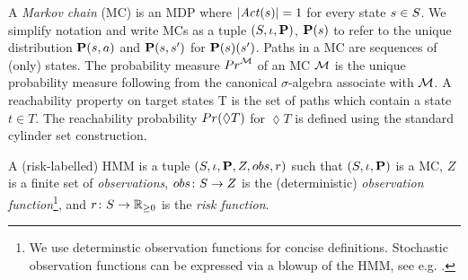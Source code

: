 \documentclass[runningheads]{llncs}
\newcommand{\Obs}{Z}
\newcommand{\act}{a}
\begin{document}
A \emph{Markov chain} (MC) is an MDP where $|\mathit{Act}(s)| = 1$ for every state $s \in S$. We simplify notation and write MCs as a tuple $\left(S, \iota,  \mathbf{P} \right)$, $\mathbf{P}(s)$ to refer to the unique distribution $\ptrans(s, \act)$ and $\mathbf{P}(s,s')$ for $\mathbf{P}(s)(s')$. Paths in a MC are sequences of (only) states.
The probability measure ${Pr}^{\mathcal{M}}$ of an MC $\mathcal{M}$ is the unique probability measure following from the canonical $\sigma$-algebra associate with $\mathcal{M}$.
A reachability property on target states T is the set of paths which contain a state $t \in T$. The reachability probability ${Pr}(\lozenge T)$ for $\lozenge T$ is defined using the standard cylinder set construction.
\begin{definition}[HMMs]
    A (risk-labelled) HMM is a tuple $\left(\Sts, \init, \ptrans, \Obs, \obsf, r \right)$ such that $\left(S, \iota, \mathbf{P} \right)$ is a MC, $\Obs$ is a finite set of \emph{observations}, $\obsf\colon \Sts \rightarrow \Obs$ is the (deterministic) \emph{observation function}\footnote{We use determinstic observation functions for concise definitions. Stochastic observation functions can be expressed via a blowup of the HMM, see e.g. \cite{jungesRuntimeMonitorsMarkov2021}.}, and $r\colon S \to \mathbb{R}_{\geq 0}$ is the \emph{risk function}.
\end{definition}
%
%
%
%
%
\end{document}
